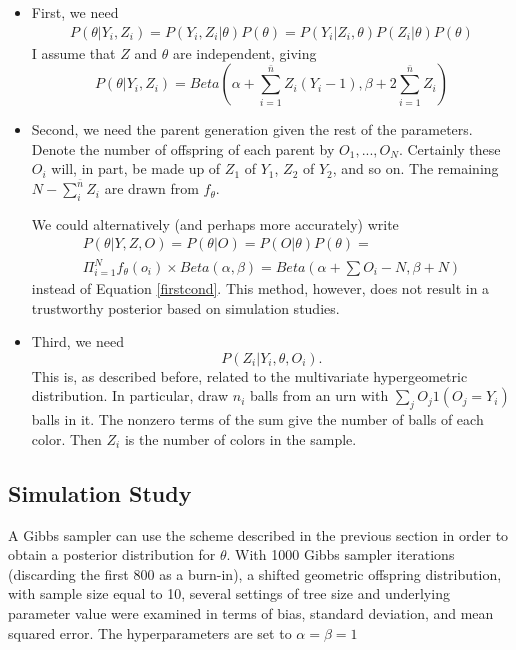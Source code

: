 \documentclass[11 pt]{article}
\renewcommand{\th}{\theta}
\newcommand{\fth}{f_{\th}}
\begin{document}
\begin{itemize}
  \item First, we need
\begin{align*}
P(\th | Y_i, Z_i) = P(Y_i, Z_i | \th) P(\th) = P(Y_i | Z_i, \th) P(Z_i | \th) P(\th)
\end{align*}
I assume that $Z$ and $\th$ are independent, giving
\begin{equation} \label{firstcond}
P(\th | Y_i, Z_i) = Beta(\alpha + \sum_{i = 1}^{\bar{n}} Z_i(Y_i - 1), \beta + 2 \sum_{i = 1}^{\bar{n}} Z_i)
\end{equation}

 \item Second, we need the parent generation given the rest of the parameters. Denote the number of offspring of each parent by $O_1,...,O_N$. Certainly these $O_i$ will, in part, be made up of $Z_1$ of $Y_1$, $Z_2$ of $Y_2$, and so on. The remaining $N - \sum_i^{\bar{n}}Z_i$ are drawn from $\fth$.

We could alternatively (and perhaps more accurately) write
\begin{align*}
P(\th | Y, Z, O) = P(\th | O) = P(O | \th) P(\th) = \\\Pi_{i = 1}^N \fth(o_i) \times Beta(\alpha,\beta) = Beta(\alpha + \sum O_i - N, \beta + N)
\end{align*}
instead of Equation \eqref{firstcond}. This method, however, does not result in a trustworthy posterior based on simulation studies. 

 \item Third, we need
\[
P(Z_i | Y_i, \th, O_i).
\]
This is, as described before, related to the multivariate hypergeometric distribution. In particular, draw $n_i$ balls from an urn with $\sum_j O_j 1(O_j = Y_i)$ balls in it. The nonzero terms of the sum give the number of balls of each color. Then $Z_i$ is the number of colors in the sample. 
\end{itemize}

\subsection{Simulation Study}

A Gibbs sampler can use the scheme described in the previous section in order to obtain a posterior distribution for $\th$. With 1000 Gibbs sampler iterations (discarding the first 800 as a burn-in), a shifted geometric offspring distribution, with sample size equal to 10, several settings of tree size and underlying parameter value were examined in terms of bias, standard deviation, and mean squared error. The hyperparameters are set to $\alpha = \beta = 1$
\end{document}
